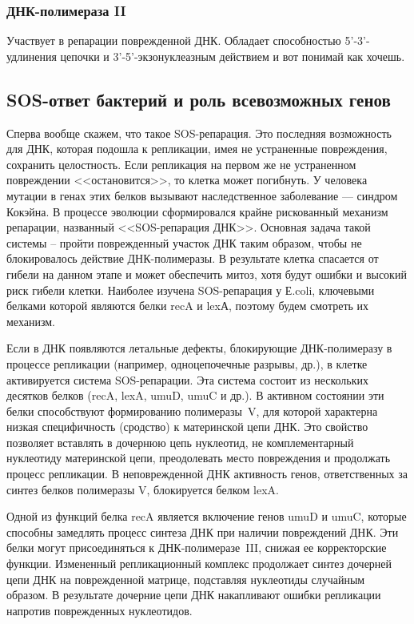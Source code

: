 \subsubsection{ДНК-полимераза II}

Участвует в репарации поврежденной ДНК. Обладает способностью 5'-3'-удлинения цепочки и 3'-5'-экзонуклеазным действием и вот понимай как хочешь.

\subsection{SOS-ответ бактерий и роль всевозможных генов}

Сперва вообще скажем, что такое SOS-репарация. Это последняя возможность для ДНК, которая подошла к репликации, имея не устраненные повреждения, сохранить целостность. Если репликация на первом же не устраненном повреждении <<остановится>>, то клетка может погибнуть.  У человека мутации в генах этих белков вызывают наследственное заболевание --- синдром Кокэйна. В процессе эволюции сформировался крайне рискованный механизм репарации, названный <<SOS-репарация ДНК>>. Основная задача такой системы – пройти поврежденный участок ДНК таким образом, чтобы не блокировалось действие ДНК-полимеразы. В результате клетка спасается от гибели на данном этапе и может обеспечить митоз, хотя будут ошибки и высокий риск гибели клетки. Наиболее изучена SOS-репарация у Е.coli, ключевыми белками которой являются белки recA и lexА, поэтому будем смотреть их механизм.

Если в ДНК появляются летальные дефекты, блокирующие ДНК-полимеразу в процессе репликации (например, одноцепочечные разрывы, др.), в клетке активируется система SOS-репарации. Эта система состоит из нескольких десятков белков (recA, lexA, umuD, umuC и др.). В активном состоянии эти белки способствуют формированию полимеразы~V, для которой характерна низкая специфичность (сродство) к материнской цепи ДНК. Это свойство позволяет вставлять в дочернюю цепь нуклеотид, не комплементарный нуклеотиду материнской цепи, преодолевать место повреждения и продолжать процесс репликации. В неповрежденной ДНК активность генов, ответственных за синтез белков полимеразы V, блокируется белком lexA.

Одной из функций белка recA является включение генов umuD и umuC, которые способны замедлять процесс синтеза ДНК при наличии повреждений ДНК. Эти белки могут присоединяться к ДНК-полимеразе~III, снижая ее корректорские функции. Измененный репликационный комплекс продолжает синтез дочерней цепи ДНК на поврежденной матрице, подставляя нуклеотиды случайным образом. В результате дочерние цепи ДНК накапливают ошибки репликации напротив поврежденных нуклеотидов.

